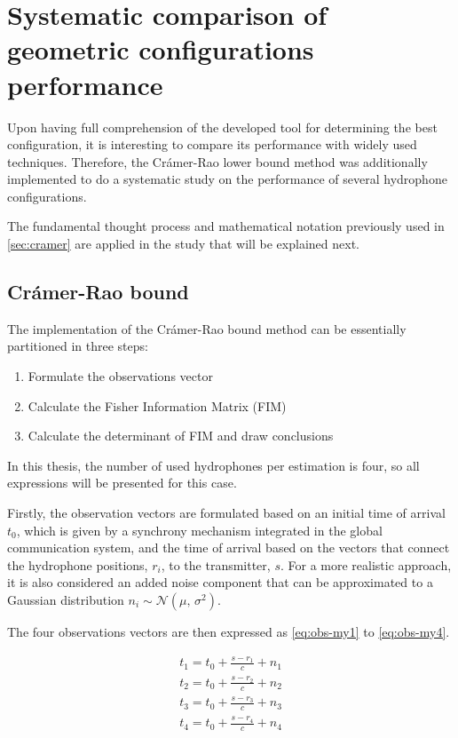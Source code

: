 \section{Systematic comparison of geometric configurations performance} \label{sec:analysis_config_performance}

Upon having full comprehension of the developed tool for determining the best configuration, it is interesting to compare its performance with widely used techniques. Therefore, the Crámer-Rao lower bound method was additionally implemented to do a systematic study on the performance of several hydrophone configurations.

The fundamental thought process and mathematical notation previously used in \ref{sec:cramer} are applied in the study that will be explained next.

\subsection{Crámer-Rao bound}  \label{sec:cramer-rao-b}

The implementation of the Crámer-Rao bound method can be essentially partitioned in three steps:

\begin{enumerate}
	
	\item Formulate the observations vector
	\item Calculate the Fisher Information Matrix (FIM)
	\item Calculate the determinant of FIM and draw conclusions
	
\end{enumerate}

In this thesis, the number of used hydrophones per estimation is four, so all expressions will be presented for this case.

Firstly, the observation vectors are formulated based on an initial time of arrival $t_0$, which is given by a synchrony mechanism integrated in the global communication system, and the time of arrival based on the vectors that connect the hydrophone positions, $r_i$, to the transmitter, $s$. For a more realistic approach, it is also considered an added noise component that can be approximated to a Gaussian distribution $n_i \sim \mathcal{N}(\mu,\,\sigma^{2})$. 

The four observations vectors are then expressed as \ref{eq:obs-my1} to \ref{eq:obs-my4}.

\begin{eqnarray}
t_1 = t_0 + \frac{s - r_1}{c} + n_1 \\
\label{eq:obs-my1}
t_2 = t_0 + \frac{s - r_2}{c} + n_2 \\
\label{eq:obs-my2}
t_3 = t_0 + \frac{s - r_3}{c} + n_3 \\
\label{eq:obs-my3}
t_4 = t_0 + \frac{s - r_4}{c} + n_4 
\label{eq:obs-my4}
\end{eqnarray}

